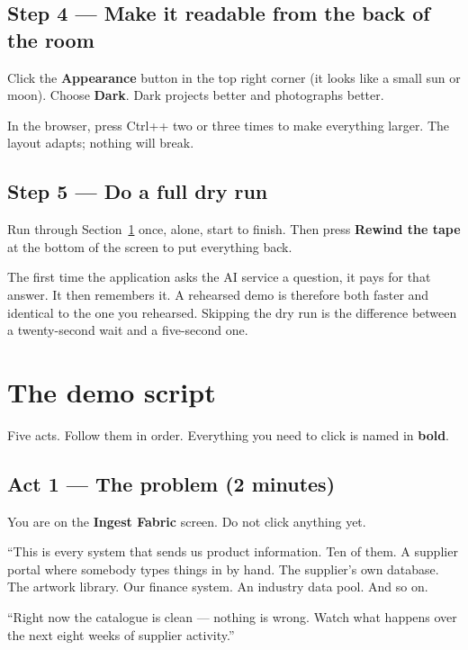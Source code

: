 \documentclass[11pt,a4paper]{article}
\newcommand{\ui}[1]{\textbf{#1}}          %
\newcommand{\key}[1]{\textsf{\small #1}}  %
\begin{document}
\subsection{Step 4 --- Make it readable from the back of the room}

Click the \ui{Appearance} button in the top right corner (it looks like a
small sun or moon). Choose \ui{Dark}. Dark projects better and photographs
better.

In the browser, press \key{Ctrl}+\key{+} two or three times to make everything
larger. The layout adapts; nothing will break.

\subsection{Step 5 --- Do a full dry run}

Run through Section~\ref{sec:script} once, alone, start to finish. Then press
\ui{Rewind the tape} at the bottom of the screen to put everything back.

\begin{careful}
The first time the application asks the AI service a question, it pays for that
answer. It then remembers it. A rehearsed demo is therefore both faster and
identical to the one you rehearsed. Skipping the dry run is the difference
between a twenty-second wait and a five-second one.
\end{careful}

\section{The demo script}
\label{sec:script}

Five acts. Follow them in order. Everything you need to click is named in
\ui{bold}.

\subsection{Act 1 --- The problem (2 minutes)}

You are on the \ui{Ingest Fabric} screen. Do not click anything yet.

\begin{say}
``This is every system that sends us product information. Ten of them. A
supplier portal where somebody types things in by hand. The supplier's own
database. The artwork library. Our finance system. An industry data pool. And
so on.

``Right now the catalogue is clean --- nothing is wrong. Watch what happens
over the next eight weeks of supplier activity.''
\end{say}
\end{document}
